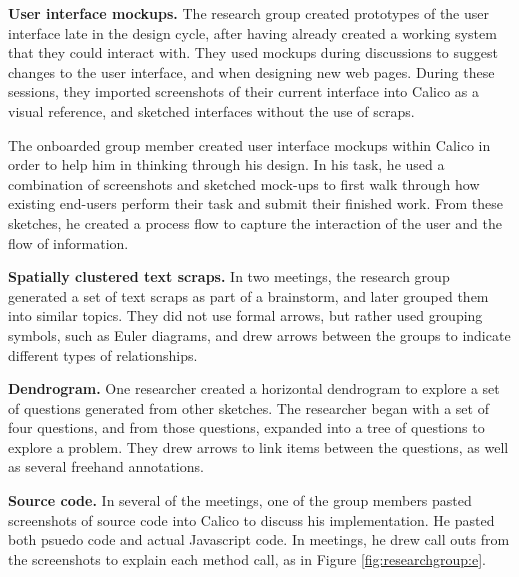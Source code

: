 \documentclass[12pt,fleqn]{ucithesis}
\begin{document}
\textbf{User interface mockups. } The research group created prototypes of the user interface late in the design cycle, after having already created a working system that they could interact with. They used mockups during discussions to suggest changes to the user interface, and when designing new web pages. During these sessions, they imported screenshots of their current interface into Calico as a visual reference, and sketched interfaces without the use of scraps.

The onboarded group member created user interface mockups within Calico in order to help him in thinking through his design. In his task, he used a combination of screenshots and sketched mock-ups to first walk through how existing end-users perform their task and submit their finished work. From these sketches, he created a process flow to capture the interaction of the user and the flow of information.

%


\textbf{Spatially clustered text scraps. } In two meetings, the research group generated a set of text scraps as part of a brainstorm, and later grouped them into similar topics. They did not use formal arrows, but rather used grouping symbols, such as Euler diagrams, and drew arrows between the groups to indicate different types of relationships. 

\textbf{Dendrogram.} One researcher created a horizontal dendrogram to explore a set of questions generated from other sketches. The researcher began with a set of four questions, and from those questions, expanded into a tree of questions to explore a problem. They drew arrows to link items between the questions, as well as several freehand annotations.

\textbf{Source code.} In several of the meetings, one of the group members pasted screenshots of source code into Calico to discuss his implementation. He pasted both psuedo code and actual Javascript code. In meetings, he drew call outs from the screenshots to explain each method call, as in Figure \ref{fig:researchgroup:e}. 
\end{document}
